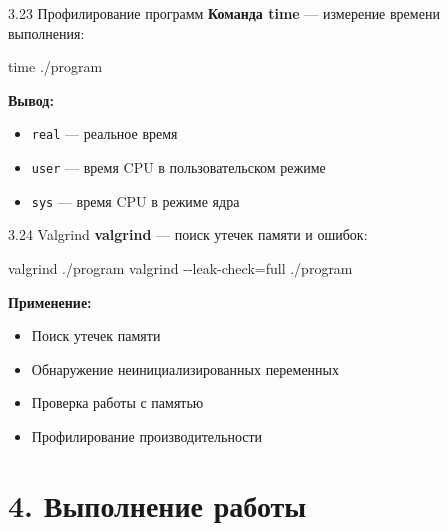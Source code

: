 \documentclass[
  ignorenonframetext,
  aspectratio=169,
  russian,
]{beamer}
\newenvironment{Shaded}{\begin{snugshade}}{\end{snugshade}}
\newcommand{\AttributeTok}[1]{\textcolor[rgb]{0.40,0.45,0.13}{#1}}
\newcommand{\BuiltInTok}[1]{\textcolor[rgb]{0.00,0.23,0.31}{#1}}
\newcommand{\FunctionTok}[1]{\textcolor[rgb]{0.28,0.35,0.67}{#1}}
\newcommand{\NormalTok}[1]{\textcolor[rgb]{0.00,0.23,0.31}{#1}}
\newcommand{\OperatorTok}[1]{\textcolor[rgb]{0.37,0.37,0.37}{#1}}
\providecommand{\tightlist}{%
  \setlength{\itemsep}{0pt}\setlength{\parskip}{0pt}}
\begin{document}
\begin{frame}[fragile]{3.23 Профилирование программ}
\label{ux43fux440ux43eux444ux438ux43bux438ux440ux43eux432ux430ux43dux438ux435-ux43fux440ux43eux433ux440ux430ux43cux43c}
\textbf{Команда time} --- измерение времени выполнения:

\begin{Shaded}
\begin{Highlighting}[]
\BuiltInTok{time}\NormalTok{ ./program}
\end{Highlighting}
\end{Shaded}

\textbf{Вывод:}

\begin{itemize}[<+->]
\tightlist
\item
  \texttt{real} --- реальное время
\item
  \texttt{user} --- время CPU в пользовательском режиме
\item
  \texttt{sys} --- время CPU в режиме ядра
\end{itemize}
\end{frame}

\begin{frame}[fragile]{3.24 Valgrind}
\label{valgrind}
\textbf{valgrind} --- поиск утечек памяти и ошибок:

\begin{Shaded}
\begin{Highlighting}[]
\FunctionTok{valgrind}\NormalTok{ ./program}
\FunctionTok{valgrind} \AttributeTok{{-}{-}leak{-}check}\OperatorTok{=}\NormalTok{full ./program}
\end{Highlighting}
\end{Shaded}

\textbf{Применение:}

\begin{itemize}[<+->]
\tightlist
\item
  Поиск утечек памяти
\item
  Обнаружение неинициализированных переменных
\item
  Проверка работы с памятью
\item
  Профилирование производительности
\end{itemize}
\end{frame}

\section{4. Выполнение
работы}\label{ux432ux44bux43fux43eux43bux43dux435ux43dux438ux435-ux440ux430ux431ux43eux442ux44b}
\end{document}
